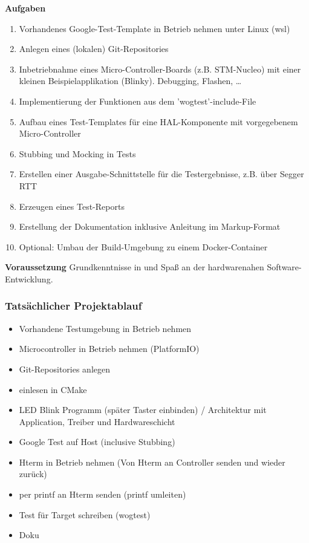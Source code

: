 \documentclass[12pt,a4paper]{article}
\begin{document}
\textbf{Aufgaben}
\begin{enumerate}
  \item Vorhandenes Google-Test-Template in Betrieb nehmen unter Linux (wsl)
  \item Anlegen eines (lokalen) Git-Repositories
  \item Inbetriebnahme eines Micro-Controller-Boards (z.B. STM-Nucleo) mit einer kleinen Beispielapplikation (Blinky). Debugging, Flashen, …
  \item Implementierung der Funktionen aus dem 'wogtest'-include-File
  \item Aufbau eines Test-Templates für eine HAL-Komponente mit vorgegebenem Micro-Controller
  \item Stubbing und Mocking in Tests
  \item Erstellen einer Ausgabe-Schnittstelle für die Testergebnisse, z.B. über Segger RTT
  \item Erzeugen eines Test-Reports
  \item Erstellung der Dokumentation inklusive Anleitung im Markup-Format
  \item Optional: Umbau der Build-Umgebung zu einem Docker-Container\newline
\end{enumerate}
\textbf{Voraussetzung}
\newline
Grundkenntnisse in und Spaß an der hardwarenahen Software-Entwicklung.

\newpage
\subsubsection{Tatsächlicher Projektablauf}
\begin{itemize}
  \item Vorhandene Testumgebung in Betrieb nehmen
  \item Microcontroller in Betrieb nehmen (PlatformIO)
  \item Git-Repositories anlegen
  \item einlesen in CMake
  \item LED Blink Programm (später Taster einbinden) / Architektur mit Application, Treiber und Hardwareschicht
  \item Google Test auf Host (inclusive Stubbing)
  \item Hterm in Betrieb nehmen (Von Hterm an Controller senden und wieder zurück)
  \item per printf an Hterm senden (printf umleiten)
  \item Test für Target schreiben (wogtest)
  \item Doku
\end{itemize}
\end{document}
